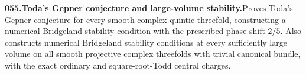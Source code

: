 \documentclass[11pt,a4paper]{article}
\begin{document}
  \par \begin{minipage}{\linewidth}
  \fontsize{10.5}{12.6}\selectfont\RaggedRight
  \hypertarget{result 055}{}
  {\bfseries\textcolor{muted}{055.}\enspace Toda's Gepner conjecture and large-volume stability.}\enspace Proves Toda's Gepner conjecture for every smooth complex quintic threefold, constructing a numerical Bridgeland stability condition with the prescribed phase shift $2/5$. Also constructs numerical Bridgeland stability conditions at every sufficiently large volume on all smooth projective complex threefolds with trivial canonical bundle, with the exact ordinary and square-root-Todd central charges.\par
  \end{minipage}\par\vspace{5pt}
\end{document}
